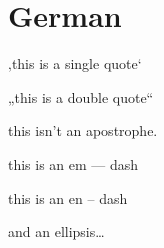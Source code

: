
\def\mytitle{MultiMarkdown German Test}


\part{German}
\label{german}

‚this is a single quote`

„this is a double quote``

this isn't an apostrophe.

this is an em --- dash

this is an en -- dash

and an ellipsis{\ldots}




